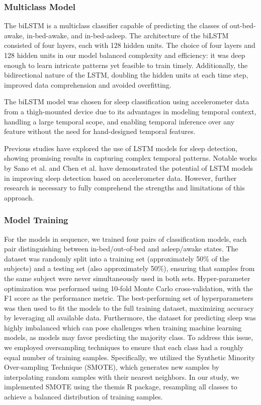\documentclass[
  super,
  preprint,
  3p]{elsarticle}
\begin{document}
\hypertarget{multiclass-model}{%
\subsubsection{Multiclass Model}\label{multiclass-model}}

The biLSTM is a multiclass classifier capable of predicting the classes
of out-bed-awake, in-bed-awake, and in-bed-asleep. The architecture of
the biLSTM consisted of four layers, each with 128 hidden units. The
choice of four layers and 128 hidden units in our model balanced
complexity and efficiency: it was deep enough to learn intricate
patterns yet feasible to train timely. Additionally, the bidirectional
nature of the LSTM, doubling the hidden units at each time step,
improved data comprehension and avoided overfitting.

The biLSTM model was chosen for sleep classification using accelerometer
data from a thigh-mounted device due to its advantages in modeling
temporal context, handling a large temporal scope, and enabling temporal
inference over any feature without the need for hand-designed temporal
features.

Previous studies have explored the use of LSTM models for sleep
detection, showing promising results in capturing complex temporal
patterns. Notable works by Sano et al. \citep{sano2019} and Chen et al.
\citep{chen2021} have demonstrated the potential of LSTM models in
improving sleep detection based on accelerometer data. However, further
research is necessary to fully comprehend the strengths and limitations
of this approach.

\hypertarget{model-training}{%
\subsubsection{Model Training}\label{model-training}}

For the models in sequence, we trained four pairs of classification
models, each pair distinguishing between in-bed/out-of-bed and
asleep/awake states. The dataset was randomly split into a training set
(approximately 50\% of the subjects) and a testing set (also
approximately 50\%), ensuring that samples from the same subject were
never simultaneously used in both sets. Hyper-parameter optimization was
performed using 10-fold Monte Carlo cross-validation, with the F1 score
as the performance metric. The best-performing set of hyperparameters
was then used to fit the models to the full training dataset, maximizing
accuracy by leveraging all available data. Furthermore, the dataset for
predicting sleep was highly imbalanced which can pose challenges when
training machine learning models, as models may favor predicting the
majority class. To address this issue, we employed oversampling
techniques to ensure that each class had a roughly equal number of
training samples. Specifically, we utilized the Synthetic Minority
Over-sampling Technique (SMOTE)\citep{chawla2002}, which generates new
samples by interpolating random samples with their nearest neighbors. In
our study, we implemented SMOTE using the themis R
package\citep{themis}, resampling all classes to achieve a balanced
distribution of training samples.
\end{document}
